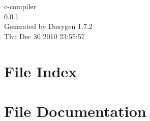 \documentclass[a4paper]{book}
\begin{document}
\hypersetup{pageanchor=false}
\begin{titlepage}
\vspace*{7cm}
\begin{center}
{\Large c-\/compiler \\[1ex]\large 0.0.1 }\\
\vspace*{1cm}
{\large Generated by Doxygen 1.7.2}\\
\vspace*{0.5cm}
{\small Thu Dec 30 2010 23:55:57}\\
\end{center}
\end{titlepage}
\clearemptydoublepage
{}
\tableofcontents
\clearemptydoublepage
{}
\hypersetup{pageanchor=true}
\chapter{File Index}

\chapter{File Documentation}
















\printindex
\end{document}
